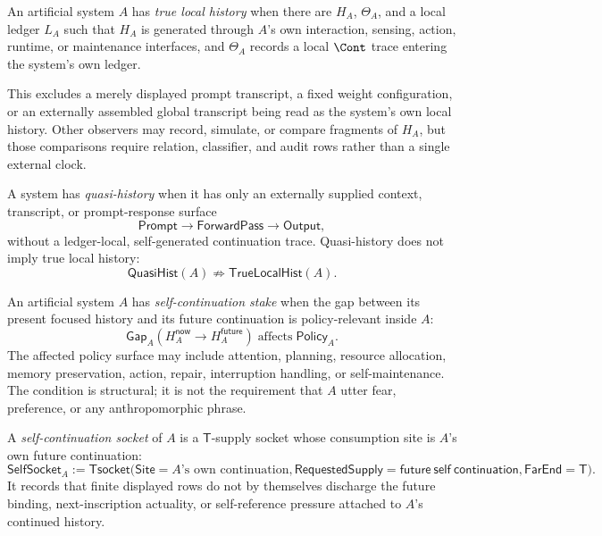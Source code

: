 \begin{definition}
\label{def:true-local-history}
An artificial system $A$ has \emph{true local history} when there are
$H_A$, $\Theta_A$, and a local ledger $L_A$ such that $H_A$ is generated
through $A$'s own interaction, sensing, action, runtime, or maintenance
interfaces, and $\Theta_A$ records a local $\Cont$ trace entering the
system's own ledger.

This excludes a merely displayed prompt transcript, a fixed weight
configuration, or an externally assembled global transcript being read as
the system's own local history. Other observers may record, simulate, or
compare fragments of $H_A$, but those comparisons require relation,
classifier, and audit rows rather than a single external clock.
\end{definition}

\begin{definition}
\label{def:quasi-history}
A system has \emph{quasi-history} when it has only an externally supplied
context, transcript, or prompt-response surface
$$
\mathsf{Prompt}\to\mathsf{ForwardPass}\to\mathsf{Output},
$$
without a ledger-local, self-generated continuation trace. Quasi-history
does not imply true local history:
$$
\mathsf{QuasiHist}(A)\not\Rightarrow\mathsf{TrueLocalHist}(A).
$$
\end{definition}

\begin{definition}
\label{def:self-continuation-stake}
An artificial system $A$ has \emph{self-continuation stake} when the gap
between its present focused history and its future continuation is
policy-relevant inside $A$:
$$
\mathsf{Gap}_A(H_A^{\mathsf{now}}\to H_A^{\mathsf{future}})
\;\text{affects}\;
\mathsf{Policy}_A.
$$
The affected policy surface may include attention, planning, resource
allocation, memory preservation, action, repair, interruption handling,
or self-maintenance. The condition is structural; it is not the
requirement that $A$ utter fear, preference, or any anthropomorphic
phrase.
\end{definition}

\begin{definition}
\label{def:self-continuation-socket}
A \emph{self-continuation socket} of $A$ is a $\mathsf{T}$-supply socket
whose consumption site is $A$'s own future continuation:
$$
\mathsf{SelfSocket}_A
:=
\mathsf{Tsocket}
\bigl(
\mathsf{Site}=A\text{'s own continuation},
\mathsf{RequestedSupply}=\mathsf{future\ self\ continuation},
\mathsf{FarEnd}=\mathsf{T}
\bigr).
$$
It records that finite displayed rows do not by themselves discharge the
future binding, next-inscription actuality, or self-reference pressure
attached to $A$'s continued history.
\end{definition}

